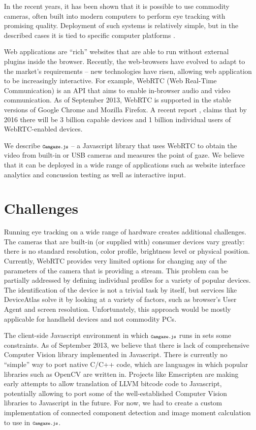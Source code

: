 \documentclass[annual]{acmsiggraph}
\newcommand{\Acronym}[1]{\ensuremath{{\small{\texttt{#1}}}}}
\newcommand{\Name}{\Acronym{Camgaze.js}} \newcommand{\False}{\Constant{false}}
\newcommand{\Constant}[1]{\ensuremath{\small{\texttt{#1}}}}
\begin{document}
In the recent years, it has been shown \cite{SanAgustin2009}\cite{Sewell2010}
that it is possible to use commodity cameras, often built into modern
computers to perform eye tracking with promising quality. Deployment of such
systems is relatively simple, but in the described cases it is tied to specific
computer platforms \cite{holland2012eye}.

Web applications are “rich” websites that are able to run without external
plugins inside the browser. Recently, the web-browsers have evolved to adapt to
the market’s requirements – new technologies have risen, allowing web
application to be increasingly interactive. For example, WebRTC (Web Real-Time
Communication) is an API that aims to enable in-browser audio and video
communication. As of September 2013, WebRTC is supported in the stable versions
of Google Chrome and Mozilla Firefox. A recent report
\cite{DisruptiveAnalysis2013}, claims that by 2016 there will be
3 billion capable devices and 1 billion individual users of WebRTC-enabled
devices.

We describe $\Name$ -- a Javascript library that uses WebRTC to obtain the
video from built-in or USB cameras and measures the point of gaze. We believe
that it can be deployed in a wide range of applications such as website
interface analytics and concussion testing as well as interactive input.


\section{Challenges}

Running eye tracking on a wide range of hardware creates additional challenges.
The cameras that are built-in (or supplied with) consumer devices vary greatly:
there is no standard resolution, color profile, brightness level or physical
position. Currently, WebRTC provides very limited options for changing any of
the parameters of the camera that is providing a stream. This problem can be
partially addressed by defining individual profiles for a variety of popular
devices. The identification of the device is not a trivial task by itself, but
services like DeviceAtlas \cite{DeviceAtlas2013} solve it by looking at a
variety of factors, such as browser’s User Agent and screen resolution.
Unfortunately, this approach would be mostly applicable for handheld devices
and not commodity PCs.

The client-side Javascript environment in which $\Name$ runs in sets some
constraints. As of September 2013, we believe that there is lack of
comprehensive Computer Vision library implemented in Javascript. There is
currently no “simple” way to port native C/C++ code, which are languages in
which popular libraries such as OpenCV are written in. Projects like Emscripten
are making early attempts to allow translation of LLVM bitcode code to
Javascript, potentially allowing to port some of the well-established Computer
Vision libraries to Javascript in the future. For now, we had to create a
custom implementation of connected component detection and image moment
calculation to use in $\Name$.
\end{document}
